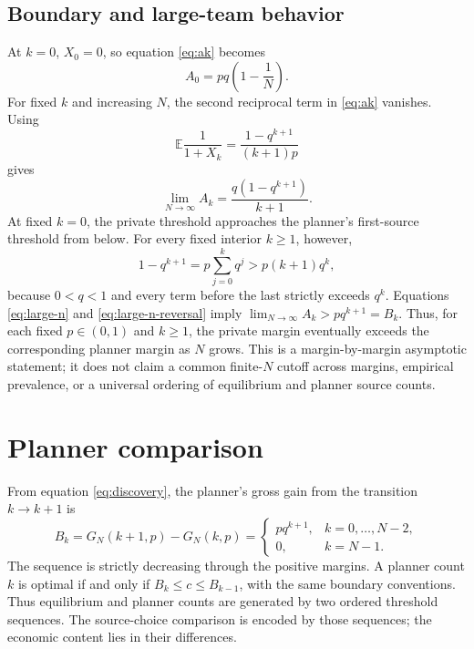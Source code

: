 \documentclass[11pt]{article}
\newcommand{\E}{\mathbb{E}}
\begin{document}
\subsection{Boundary and large-team behavior}

At $k=0$, $X_0=0$, so equation \eqref{eq:ak} becomes
\begin{equation}
 A_0=pq\left(1-\frac1N\right).
 \label{eq:a0}
\end{equation}
For fixed $k$ and increasing $N$, the second reciprocal term in
\eqref{eq:ak} vanishes. Using
\[
 \E\frac{1}{1+X_k}=\frac{1-q^{k+1}}{(k+1)p}
\]
gives
\begin{equation}
 \lim_{N\to\infty}A_k=\frac{q(1-q^{k+1})}{k+1}.
 \label{eq:large-n}
\end{equation}
At fixed $k=0$, the private threshold approaches the planner's first-source
threshold from below. For every fixed interior $k\geq1$, however,
\begin{equation}
 1-q^{k+1}=p\sum_{j=0}^{k}q^j
 >p(k+1)q^k,
 \label{eq:large-n-reversal}
\end{equation}
because $0<q<1$ and every term before the last strictly exceeds $q^k$.
Equations \eqref{eq:large-n} and \eqref{eq:large-n-reversal} imply
\(\lim_{N\to\infty}A_k>pq^{k+1}=B_k\). Thus, for each fixed $p\in(0,1)$
and $k\geq1$, the private margin eventually exceeds the corresponding planner
margin as $N$ grows. This is a margin-by-margin asymptotic statement; it does
not claim a common finite-$N$ cutoff across margins, empirical prevalence, or a
universal ordering of equilibrium and planner source counts.

\section{Planner comparison}

From equation \eqref{eq:discovery}, the planner's gross gain from the transition
$k\to k+1$ is
\begin{equation}
 B_k=G_N(k+1,p)-G_N(k,p)=
 \begin{cases}
 pq^{k+1}, & k=0,\ldots,N-2,\\
 0, & k=N-1.
 \end{cases}
 \label{eq:bk}
\end{equation}
The sequence is strictly decreasing through the positive margins. A planner
count $k$ is optimal if and only if $B_k\le c\le B_{k-1}$, with the same
boundary conventions. Thus equilibrium and planner counts are generated by two
ordered threshold sequences. The source-choice comparison is encoded by those
sequences; the economic content lies in their differences.
\end{document}
